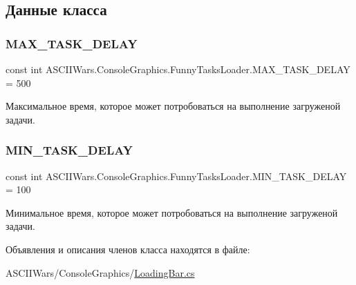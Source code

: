 \subsection{Данные класса}
\hypertarget{class_a_s_c_i_i_wars_1_1_console_graphics_1_1_funny_tasks_loader_a0c34f365b46e3cc7e9974d5412b05f6c}{}\label{class_a_s_c_i_i_wars_1_1_console_graphics_1_1_funny_tasks_loader_a0c34f365b46e3cc7e9974d5412b05f6c} 
\subsubsection{\texorpdfstring{M\+A\+X\+\_\+\+T\+A\+S\+K\+\_\+\+D\+E\+L\+AY}{MAX\_TASK\_DELAY}}
{\footnotesize\ttfamily const int A\+S\+C\+I\+I\+Wars.\+Console\+Graphics.\+Funny\+Tasks\+Loader.\+M\+A\+X\+\_\+\+T\+A\+S\+K\+\_\+\+D\+E\+L\+AY = 500\hspace{0.3cm}{\ttfamily [private]}}



Максимальное время, которое может потробоваться на выполнение загруженой задачи. 

\hypertarget{class_a_s_c_i_i_wars_1_1_console_graphics_1_1_funny_tasks_loader_a9008864a7b23b6e86b350b5c2097151c}{}\label{class_a_s_c_i_i_wars_1_1_console_graphics_1_1_funny_tasks_loader_a9008864a7b23b6e86b350b5c2097151c} 
\subsubsection{\texorpdfstring{M\+I\+N\+\_\+\+T\+A\+S\+K\+\_\+\+D\+E\+L\+AY}{MIN\_TASK\_DELAY}}
{\footnotesize\ttfamily const int A\+S\+C\+I\+I\+Wars.\+Console\+Graphics.\+Funny\+Tasks\+Loader.\+M\+I\+N\+\_\+\+T\+A\+S\+K\+\_\+\+D\+E\+L\+AY = 100\hspace{0.3cm}{\ttfamily [private]}}



Минимальное время, которое может потробоваться на выполнение загруженой задачи. 



Объявления и описания членов класса находятся в файле\+:\begin{DoxyCompactItemize}
\item 
A\+S\+C\+I\+I\+Wars/\+Console\+Graphics/\hyperlink{_loading_bar_8cs}{Loading\+Bar.\+cs}\end{DoxyCompactItemize}
